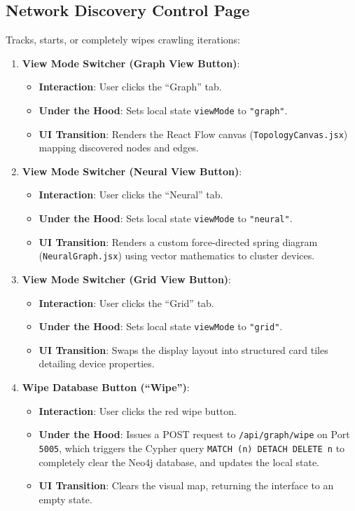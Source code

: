 \documentclass[11pt,a4paper]{article}
\begin{document}
\subsection{Network Discovery Control Page}
Tracks, starts, or completely wipes crawling iterations:
\begin{enumerate}
    \item \textbf{View Mode Switcher (Graph View Button)}:
    \begin{itemize}
        \item \textbf{Interaction}: User clicks the ``Graph'' tab.
        \item \textbf{Under the Hood}: Sets local state \texttt{viewMode} to \texttt{"graph"}.
        \item \textbf{UI Transition}: Renders the React Flow canvas (\texttt{TopologyCanvas.jsx}) mapping discovered nodes and edges.
    \end{itemize}
    
    \item \textbf{View Mode Switcher (Neural View Button)}:
    \begin{itemize}
        \item \textbf{Interaction}: User clicks the ``Neural'' tab.
        \item \textbf{Under the Hood}: Sets local state \texttt{viewMode} to \texttt{"neural"}.
        \item \textbf{UI Transition}: Renders a custom force-directed spring diagram (\texttt{NeuralGraph.jsx}) using vector mathematics to cluster devices.
    \end{itemize}
    
    \item \textbf{View Mode Switcher (Grid View Button)}:
    \begin{itemize}
        \item \textbf{Interaction}: User clicks the ``Grid'' tab.
        \item \textbf{Under the Hood}: Sets local state \texttt{viewMode} to \texttt{"grid"}.
        \item \textbf{UI Transition}: Swaps the display layout into structured card tiles detailing device properties.
    \end{itemize}
    
    \item \textbf{Wipe Database Button (``Wipe'')}:
    \begin{itemize}
        \item \textbf{Interaction}: User clicks the red wipe button.
        \item \textbf{Under the Hood}: Issues a POST request to \texttt{/api/graph/wipe} on Port \texttt{5005}, which triggers the Cypher query \texttt{MATCH (n) DETACH DELETE n} to completely clear the Neo4j database, and updates the local state.
        \item \textbf{UI Transition}: Clears the visual map, returning the interface to an empty state.
    \end{itemize}
    

\end{enumerate}
\end{document}
